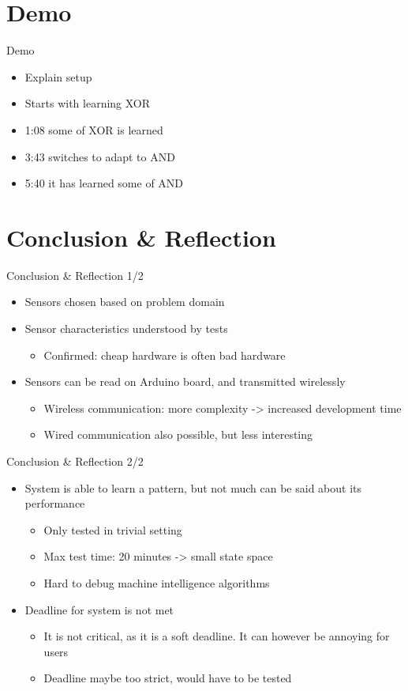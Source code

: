 \section{Demo}
\begin{frame}{Demo}
	\begin{itemize}
    \item Explain setup
		\item Starts with learning XOR
		\item 1:08 some of XOR is learned
		\item 3:43 switches to adapt to AND
		\item 5:40 it has learned some of AND
	\end{itemize}
\end{frame}

\section{Conclusion \& Reflection}
\begin{frame}{Conclusion \& Reflection 1/2}
	\begin{itemize}
    \item Sensors chosen based on problem domain
    \item Sensor characteristics understood by tests
      \begin{itemize}
        \item Confirmed: cheap hardware is often bad hardware
      \end{itemize}
    \item Sensors can be read on Arduino board, and transmitted wirelessly
      \begin{itemize}
        \item Wireless communication: more complexity -> increased development time
        \item Wired communication also possible, but less interesting
      \end{itemize}
  \end{itemize}
\end{frame}

\begin{frame}{Conclusion \& Reflection 2/2}
	\begin{itemize}
    \item System is able to learn a pattern, but not much can be said about its performance
      \begin{itemize}
        \item Only tested in trivial setting
        \item Max test time: 20 minutes -> small state space
        \item Hard to debug machine intelligence algorithms
      \end{itemize}
		\item Deadline for system is not met
      \begin{itemize}
      \item It is not critical, as it is a soft deadline. It can however be annoying for users
      \item Deadline maybe too strict, would have to be tested
      \end{itemize}
	\end{itemize}
\end{frame}